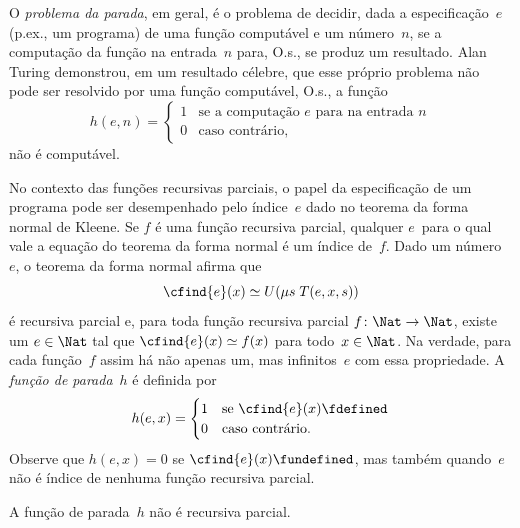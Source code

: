 \documentclass[../../../include/open-logic-section]{subfiles}
\begin{document}

O \emph{problema da parada}, em geral, é o problema de decidir, dada a
especificação~$e$ (p.ex., um programa) de uma função computável e
um número~$n$, se a computação da função na entrada~$n$ para, O.s.\@,
se produz um resultado. Alan Turing demonstrou, em um resultado célebre,
que esse próprio problema não pode ser resolvido por uma função
computável, O.s.\@, a função
\[
h(e, n) =
\begin{cases}
1 & \text{se a computação $e$ para na entrada $n$}\\
0 & \text{caso contrário,}
\end{cases}
\]
não é computável.

No contexto das funções recursivas parciais, o papel da especificação
de um programa pode ser desempenhado pelo índice~$e$ dado no teorema
da forma normal de Kleene. Se $f$ é uma função recursiva parcial,
qualquer $e$~para o qual vale a equação do teorema da forma normal é
um índice de~$f$. Dado um número~$e$, o teorema da forma normal afirma
que
\[
\cfind{e}(x) \simeq U(\mu s \; T(e, x, s))
\]
é recursiva parcial e, para toda função recursiva parcial $f\colon \Nat
\to \Nat$, existe um $e \in \Nat$ tal que $\cfind{e}(x) \simeq
f(x)$ para todo~$x \in \Nat$. Na verdade, para cada função~$f$ assim
há não apenas um, mas infinitos~$e$ com essa propriedade. A
\emph{função de parada}~$h$ é definida por
\[
h(e, x) =
\begin{cases}
1 & \text{se $\cfind{e}(x) \fdefined$}\\
0 & \text{caso contrário.}
\end{cases}
\]
Observe que $h(e, x) = 0$ se $\cfind{e}(x) \fundefined$, mas também
quando~$e$ não é índice de nenhuma função recursiva parcial.

\begin{thm}
A função de parada~$h$ não é recursiva parcial.
\end{thm}
\end{document}
